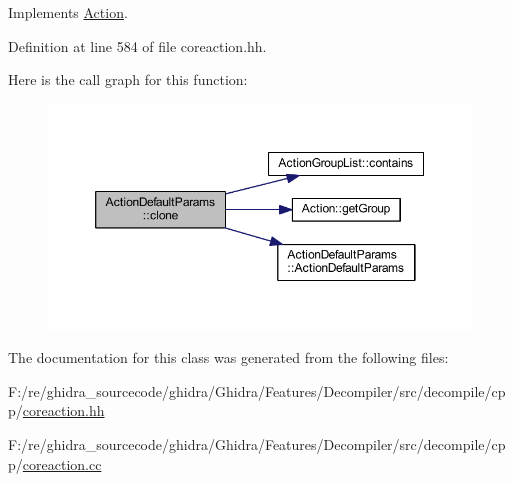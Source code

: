 Implements \mbox{\hyperlink{class_action_af8242e41d09e5df52f97df9e65cc626f}{Action}}.



Definition at line 584 of file coreaction.\+hh.

Here is the call graph for this function\+:
\nopagebreak
\begin{figure}[H]
\begin{center}
\leavevmode
\includegraphics[width=350pt]{class_action_default_params_ab1eaa217e71047b924bf0decd2f067a1_cgraph}
\end{center}
\end{figure}


The documentation for this class was generated from the following files\+:\begin{DoxyCompactItemize}
\item 
F\+:/re/ghidra\+\_\+sourcecode/ghidra/\+Ghidra/\+Features/\+Decompiler/src/decompile/cpp/\mbox{\hyperlink{coreaction_8hh}{coreaction.\+hh}}\item 
F\+:/re/ghidra\+\_\+sourcecode/ghidra/\+Ghidra/\+Features/\+Decompiler/src/decompile/cpp/\mbox{\hyperlink{coreaction_8cc}{coreaction.\+cc}}\end{DoxyCompactItemize}
